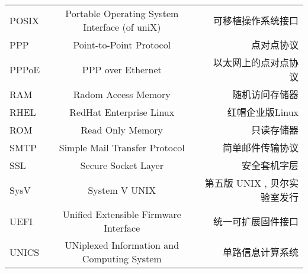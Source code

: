\begin{landscape}
\begin{center}
\begin{supertabular}{l|c|r}
POSIX & Portable Operating System Interface (of uniX) & 可移植操作系统接口 \\
PPP & Point-to-Point Protocol & 点对点协议 \\
PPPoE & PPP over Ethernet& 以太网上的点对点协议 \\
RAM & Radom Access Memory & 随机访问存储器\\
RHEL & RedHat Enterprise Linux & 红帽企业版Linux\\
ROM & Read Only Memory & 只读存储器\\
SMTP & Simple Mail Transfer Protocol & 简单邮件传输协议 \\
SSL & Secure  Socket Layer & 安全套机字层 \\

SysV & System V UNIX & 第五版 UNIX , 贝尔实验室发行 \\
UEFI & Unified Extensible Firmware Interface & 统一可扩展固件接口 \\
UNICS & UNiplexed Information and Computing System & 单路信息计算系统\\
\end{supertabular}
\end{center}
\end{landscape}